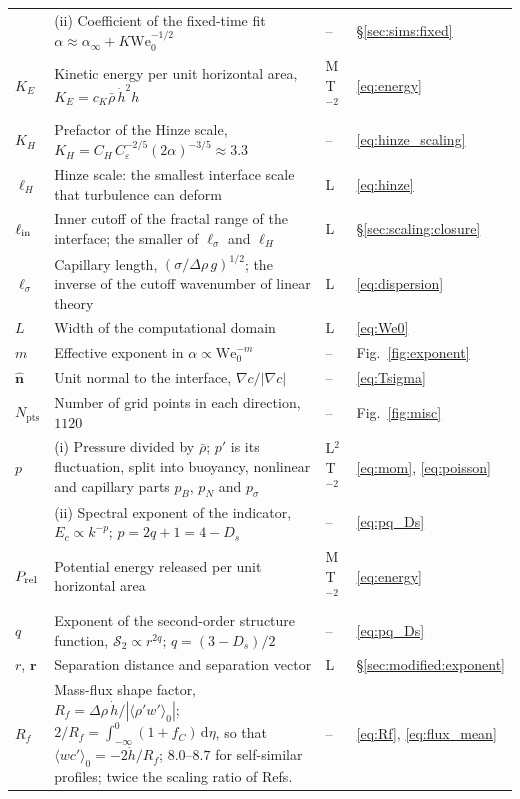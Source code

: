 \documentclass[11pt]{article}
\numberwithin{equation}{section}
\newcommand{\avg}[1]{\langle #1\rangle}
\newcommand{\We}{\mathrm{We}_0}
\newcommand{\ls}{\ell_\sigma}
\newcommand{\hd}{\dot h}
\begin{document}
\begin{longtable}{@{}P{0.13}P{0.53}P{0.13}P{0.13}@{}}
 & (ii) Coefficient of the fixed-time fit $\alpha \approx \alpha_\infty + K \We^{-1/2}$ & -- & \S\ref{sec:sims:fixed}\\
$K_E$ & Kinetic energy per unit horizontal area, $K_E = c_K \bar\rho \, \hd^2 h$ & M\,T$^{-2}$ & \eqref{eq:energy}\\
$K_H$ & Prefactor of the Hinze scale, $K_H = C_H \, C_\varepsilon^{-2/5}(2 \alpha)^{-3/5} \approx 3.3$ & -- & \eqref{eq:hinze_scaling}\\
$\ell_H$ & Hinze scale: the smallest interface scale that turbulence can deform & L & \eqref{eq:hinze}\\
$\ell_{\rm in}$ & Inner cutoff of the fractal range of the interface; the smaller of $\ls$ and $\ell_H$ & L & \S\ref{sec:scaling:closure}\\
$\ls$ & Capillary length, $(\sigma/\Delta \rho \, g)^{1/2}$; the inverse of the cutoff wavenumber of linear theory & L & \eqref{eq:dispersion}\\
$L$ & Width of the computational domain & L & \eqref{eq:We0}\\
$m$ & Effective exponent in $\alpha \propto \We^{-m}$ & -- & Fig.~\ref{fig:exponent}\\
$\hat{\mathbf n}$ & Unit normal to the interface, $\nabla c/| \nabla c |$ & -- & \eqref{eq:Tsigma}\\
$N_\mathrm{pts}$ & Number of grid points in each direction, $1120$ & -- & Fig.~\ref{fig:misc}\\
$p$ & (i) Pressure divided by $\bar\rho$; $p'$ is its fluctuation, split into buoyancy, nonlinear and capillary parts $p_B$, $p_N$ and $p_\sigma$ & L$^2$T$^{-2}$ & \eqref{eq:mom}, \eqref{eq:poisson}\\
 & (ii) Spectral exponent of the indicator, $E_c \propto k^{-p}$; $p = 2 q + 1 = 4 - D_s$ & -- & \eqref{eq:pq_Ds}\\
$P_{\rm rel}$ & Potential energy released per unit horizontal area & M\,T$^{-2}$ & \eqref{eq:energy}\\
$q$ & Exponent of the second-order structure function, $\mathcal S_2 \propto r^{2 q}$; $q = (3 - D_s)/2$ & -- & \eqref{eq:pq_Ds}\\
$r$, $\mathbf r$ & Separation distance and separation vector & L & \S\ref{sec:modified:exponent}\\
$R_f$ & Mass-flux shape factor, $R_f = \Delta \rho \, \hd/| \avg{\rho' w'}_0 |$; $2/R_f = \int_{-\infty}^0 (1 + f_C) \, \mathrm d \eta$, so that $\avg{w c'}_0 = -2 \hd/R_f$; $8.0$--$8.7$ for self-similar profiles; twice the scaling ratio of Refs.~\cite{Walker2026,Walker2027_1} & -- & \eqref{eq:Rf}, \eqref{eq:flux_mean}\\

\end{longtable}
\end{document}
